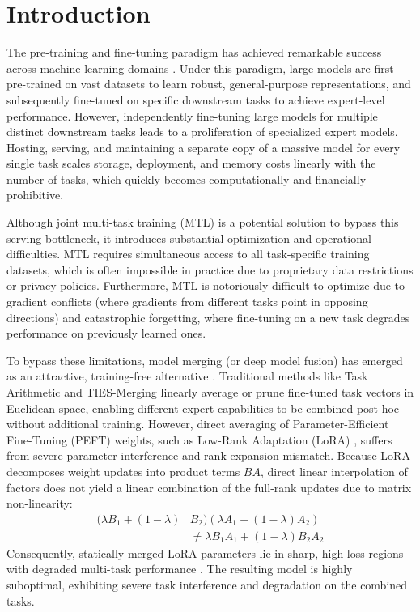 \documentclass{article}
\begin{document}
\section{Introduction}
\label{introduction}
The pre-training and fine-tuning paradigm has achieved remarkable success across machine learning domains \cite{devlin2018bert, vaswani2017attention, he2016resnet}. Under this paradigm, large models are first pre-trained on vast datasets to learn robust, general-purpose representations, and subsequently fine-tuned on specific downstream tasks to achieve expert-level performance. However, independently fine-tuning large models for multiple distinct downstream tasks leads to a proliferation of specialized expert models. Hosting, serving, and maintaining a separate copy of a massive model for every single task scales storage, deployment, and memory costs linearly with the number of tasks, which quickly becomes computationally and financially prohibitive.

Although joint multi-task training (MTL) is a potential solution to bypass this serving bottleneck, it introduces substantial optimization and operational difficulties. MTL requires simultaneous access to all task-specific training datasets, which is often impossible in practice due to proprietary data restrictions or privacy policies. Furthermore, MTL is notoriously difficult to optimize due to gradient conflicts (where gradients from different tasks point in opposing directions) and catastrophic forgetting, where fine-tuning on a new task degrades performance on previously learned ones.

To bypass these limitations, model merging (or deep model fusion) has emerged as an attractive, training-free alternative \cite{wortsman2022soups, ilharco2022taskarithmetic}. Traditional methods like Task Arithmetic \cite{ilharco2022taskarithmetic} and TIES-Merging \cite{yadav2023ties} linearly average or prune fine-tuned task vectors in Euclidean space, enabling different expert capabilities to be combined post-hoc without additional training. However, direct averaging of Parameter-Efficient Fine-Tuning (PEFT) weights, such as Low-Rank Adaptation (LoRA) \cite{hu2021lora}, suffers from severe parameter interference and rank-expansion mismatch. Because LoRA decomposes weight updates into product terms $BA$, direct linear interpolation of factors does not yield a linear combination of the full-rank updates due to matrix non-linearity:
\begin{align}
(\lambda B_1 + (1 - \lambda) &B_2)(\lambda A_1 + (1 - \lambda) A_2) \nonumber \\
&\neq \lambda B_1 A_1 + (1 - \lambda) B_2 A_2
\end{align}
Consequently, statically merged LoRA parameters lie in sharp, high-loss regions with degraded multi-task performance \cite{niwa2024dare}. The resulting model is highly suboptimal, exhibiting severe task interference and degradation on the combined tasks.
\end{document}
